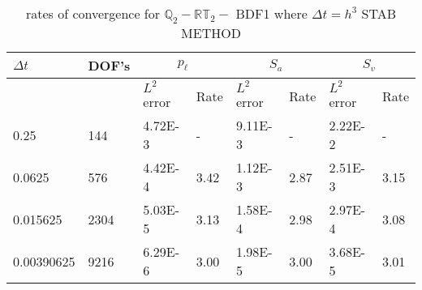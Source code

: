 \begin{table}[ht]
	\centering
	\begin{tabular}{|l|l|l||l|l||l|l|l|}
		\hline
		$\Delta t$ & DOF's & \multicolumn{2}{c|}{$p_{\ell}$} & \multicolumn{2}{c|}{$S_a$} & \multicolumn{2}{c|}{$S_v$}  \\ \hline
		& & $L^2$ error & Rate & $L^2$ error & Rate & $L^2$ error & Rate \\ \hline
		0.25   	  & 144   & 4.72E-3 & -	   & 9.11E-3 & -    & 2.22E-2 & - \\ \hline
		0.0625    & 576   & 4.42E-4 & 3.42 & 1.12E-3 & 2.87 & 2.51E-3 & 3.15 \\ \hline
		0.015625  & 2304  & 5.03E-5 & 3.13 & 1.58E-4 & 2.98 & 2.97E-4 & 3.08 \\ \hline
		0.00390625& 9216  & 6.29E-6 & 3.00 & 1.98E-5 & 3.00 & 3.68E-5 & 3.01 \\ \hline 
	\end{tabular}
	\caption[Template table-description for list of tables.]{ rates of convergence for $\mathbb{Q}_2 - \mathbb{RT}_2-$ BDF1 where $\Delta t = h^3$  STAB METHOD }
\end{table}





